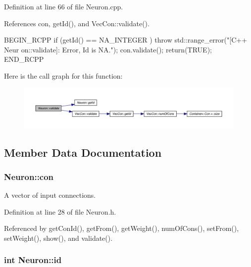 Definition at line 66 of file Neuron.cpp.



References con, getId(), and VecCon::validate().


\begin{DoxyCode}
                          {
        BEGIN_RCPP
        if (getId() == NA_INTEGER )             throw std::range_error("[C++ Neur
      on::validate]: Error, Id is NA.");
        con.validate();
        return(TRUE);
        END_RCPP

}
\end{DoxyCode}


Here is the call graph for this function:
\nopagebreak
\begin{figure}[H]
\begin{center}
\leavevmode
\includegraphics[width=400pt]{class_neuron_a95327aa80a9ec949491f214a0c159b5a_cgraph}
\end{center}
\end{figure}




\subsection{Member Data Documentation}
\hypertarget{class_neuron_a1451f2424a8f9e46ca643d03ff98a616}{
\subsubsection[{con}]{ {\bf Neuron::con}}}
\label{class_neuron_a1451f2424a8f9e46ca643d03ff98a616}


A vector of input connections. 



Definition at line 28 of file Neuron.h.



Referenced by getConId(), getFrom(), getWeight(), numOfCons(), setFrom(), setWeight(), show(), and validate().

\hypertarget{class_neuron_aef4b01c293054fa2e5419afd56afd628}{
\subsubsection[{id}]{\setlength{\rightskip}{0pt plus 5cm}int {\bf Neuron::id}}}
\label{class_neuron_aef4b01c293054fa2e5419afd56afd628}


